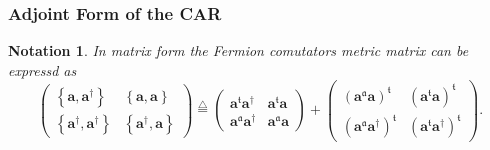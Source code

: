 \documentclass[aps, preprint]{revtex4}
\newtheorem{notation}[theorem]{Notation}
\begin{document}
\subsubsection{Adjoint Form of the CAR}
\begin{notation}
In matrix form the Fermion comutators metric matrix can be expressd as
\begin{equation}\left (\begin{array}{cc}\left \{\mathbf{a} ,\mathbf{a}^{ \dag }\right \} & \left \{\mathbf{a} ,\mathbf{a}\right \} \\
\left \{\mathbf{a}^{ \dag } ,\mathbf{a}^{ \dag }\right \} & \left \{\mathbf{a}^{ \dag } ,\mathbf{a}\right \}\end{array}\right )\overset{\triangle }{ =}\left (\begin{array}{cc}\mathbf{a}^{\mathfrak{t}} \mathbf{a}^{ \dag } & \mathbf{a}^{\mathfrak{t}} \mathbf{a} \\
\mathbf{a}^{\mathfrak{a}} \mathbf{a}^{ \dag } & \mathbf{a}^{\mathfrak{a}} \mathbf{a}\end{array}\right ) +\left (\begin{array}{cc}\left (\mathbf{a}^{\mathfrak{a}} \mathbf{a}\right )^{\mathfrak{t}} & \left (\mathbf{a}^{\mathfrak{t}} \mathbf{a}\right )^{\mathfrak{t}} \\
\left (\mathbf{a}^{\mathfrak{a}} \mathbf{a}^{ \dag }\right )^{\mathfrak{t}} & \left (\mathbf{a}^{\mathfrak{t}} \mathbf{a}^{ \dag }\right )^{\mathfrak{t}}\end{array}\right )\text{.}
\end{equation}
\end{notation}
\end{document}

